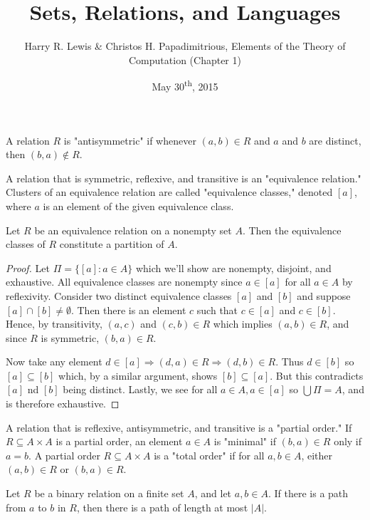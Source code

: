 \documentclass[a4paper,11pt]{article}
\title{Sets, Relations, and Languages}
\author{Harry R. Lewis \& Christos H. Papadimitrious, Elements of the Theory of Computation (Chapter 1)}
\date{May 30\textsuperscript{th}, 2015}
\begin{document}
\maketitle
{}

\begin{outline}

    A relation \(R\) is "antisymmetric" if whenever \((a,b)\in R\) and \(a\) and \(b\) are distinct, then
    \((b, a) \not\in R\).
    
    A relation that is symmetric, reflexive, and transitive is an "equivalence relation." Clusters of an
    equivalence relation are called "equivalence classes," denoted \([a]\), where \(a\) is an element of the
    given equivalence class.
    
    Let \(R\) be an equivalence relation on a nonempty set \(A\). Then the equivalence classes of \(R\) constitute
    a partition of \(A\).
    
    \begin{proof}
      Let \(\Pi = \{[a] : a \in A\}\) which we'll show are nonempty, disjoint, and exhaustive. All equivalence classes
      are nonempty since \(a \in [a]\) for all \(a \in A\) by reflexivity. Consider two distinct equivalence classes 
      \([a]\) and \([b]\) and suppose \([a] \cap [b] \neq \emptyset\). Then there is an element \(c\) such that 
      \(c \in [a]\) and \(c \in [b]\). Hence, by transitivity, \((a, c)\) and \((c, b) \in R\) which implies 
      \((a, b) \in R\), and since \(R\) is symmetric, \((b, a) \in R\).
      
      Now take any element \(d \in [a] \Rightarrow (d, a)\in R \Rightarrow (d, b) \in R\). Thus \(d \in [b]\) so 
      \([a] \subseteq [b]\) which, by a similar argument, shows \([b] \subseteq [a]\). But this contradicts
      \([a]\) nd \([b]\) being distinct. Lastly, we see for all \(a \in A, a \in [a]\) so \(\bigcup\Pi = A\),
      and is therefore exhaustive.
    \end{proof}
    
    A relation that is reflexive, antisymmetric, and transitive is a "partial order." If \(R \subseteq A \times A\)
    is a partial order, an element \(a \in A\) is "minimal" if \((b, a)\in R\) only if \(a=b\). A partial order 
    \(R \subseteq A\times A\) is a "total order" if for all \(a, b \in A\), either \((a, b)\in R\) or 
    \((b, a)\in R\).
    
    Let \(R\) be a binary relation on a finite set \(A\), and let \(a, b\in A\). If there is a path from \(a\) to 
    \(b\) in \(R\), then there is a path of length at most \(|A|\).
    

\end{outline}
\end{document}
